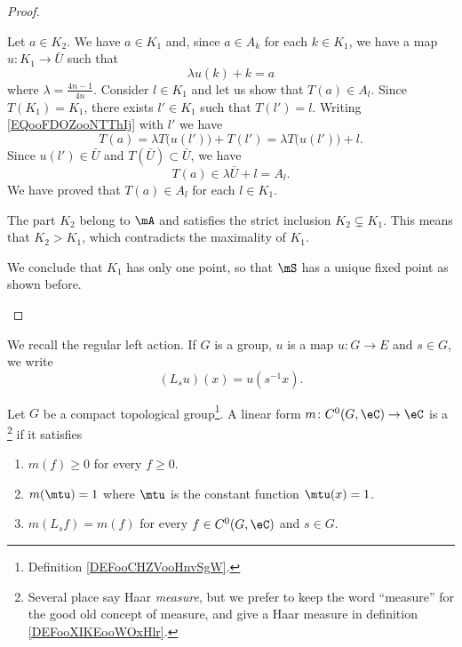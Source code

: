 \begin{proof}
\begin{subproof}
\begin{subproof}
			Let \( a\in K_2\). We have \( a\in K_1\) and, since \( a\in A_k\) for each \( k\in K_1\), we have a map \( u\colon K_1\to \bar U\) such that
			\begin{equation}        \label{EQooFDOZooNTThIj}
				\lambda u(k)+k=a
			\end{equation}
			where \( \lambda=\frac{ 4n-1 }{ 4n }\).
			Consider \( l\in K_1\) and let us show that \( T(a)\in A_{l}\). Since \( T(K_1)=K_1\), there exists \( l'\in K_1\) such that \( T(l')=l\). Writing \eqref{EQooFDOZooNTThIj} with \( l'\) we have
			\begin{equation}
				T(a)=\lambda T\big( u(l') \big)+T(l')=\lambda T\big( u(l') \big)+l.
			\end{equation}
			Since \( u(l')\in \bar U\) and \( T(\bar U)\subset \bar U\), we have
			\begin{equation}
				T(a)\in \lambda\bar U+l=A_l.
			\end{equation}
			We have proved that \( T(a)\in A_l\) for each \( l\in K_1\).
		\end{subproof}
		\spitem[Conclusion]
		The part \( K_2\) belong to \( \mA\) and satisfies the strict inclusion \( K_2\subsetneq K_1\). This means that \( K_2>K_1\), which contradicts the maximality of \( K_1\).

		We conclude that \( K_1\) has only one point, so that \( \mS\) has a unique fixed point as shown before.
	\end{subproof}
\end{proof}

We recall the regular left action. If \( G\) is a group, \( u\) is a map \( u\colon G\to E\) and \( s\in G\), we write
\begin{equation}
	(L_su)(x)=u(s^{-1}x).
\end{equation}

\begin{definition}        \label{DEFooSBRZooUbzMnN}
	Let \( G\) be a compact topological group\footnote{Definition \ref{DEFooCHZVooHnvSgW}.}. A linear form \( m\colon C^0(G,\eC)\to \eC\) is a \footnote{Several place say Haar \emph{measure}, but we prefer to keep the word ``measure'' for the good old concept of measure, and give a Haar measure in definition \ref{DEFooXIKEooWOxHlr}.} if it satisfies
	\begin{enumerate}
		\item
		      \( m(f)\geq 0\) for every \( f\geq 0\).
		\item
		      \( m(\mtu)=1\) where \( \mtu\) is the constant function \( \mtu(x)=1\).
		\item
		      \( m(L_sf)=m(f)\) for every \( f\in C^0(G,\eC)\) and \( s\in G\).
	\end{enumerate}
\end{definition}


